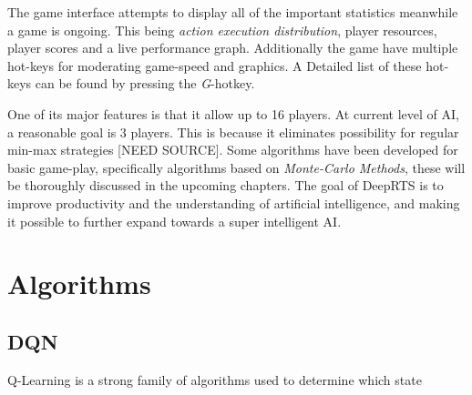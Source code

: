 \documentclass[fleqn,10pt]{article} %
\begin{document}
The game interface attempts to display all of the important statistics meanwhile a game is ongoing. This being \textit{action execution distribution}, player resources, player scores and a live performance graph.
Additionally the game have multiple hot-keys for moderating game-speed and graphics. A Detailed list of these hot-keys can be found by pressing the \textit{G}-hotkey. 

One of its major features is that it allow up to 16 players. At current level of AI, a reasonable goal is 3 players. This is because it eliminates possibility for regular min-max strategies [NEED SOURCE]. Some algorithms have been developed for basic game-play, specifically algorithms based on \textit{Monte-Carlo Methods}, these will be thoroughly discussed in the upcoming chapters.
The goal of DeepRTS is to improve productivity and the understanding of artificial intelligence, and making it possible to further expand towards a super intelligent AI.


\section{Algorithms}

\subsection{DQN}
Q-Learning is a strong family of algorithms used to determine which state
\end{document}
